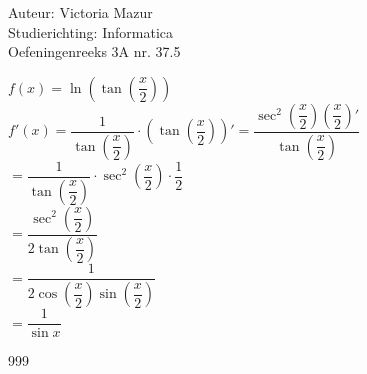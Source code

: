 \documentclass[a4paper]{article}
\begin{document}
  
\noindent \large Auteur: Victoria Mazur \\
\noindent \large Studierichting: Informatica\\
\noindent \large Oefeningenreeks 3A nr. 37.5\\

\medskip

\normalsize

$f(x) = \ln \left( \tan \left( \dfrac{x}{2} \right) \right)$ \\

$f'(x) = \dfrac{1}{\tan \left( \dfrac{x}{2} \right)} \cdot \left( \tan \left( \dfrac{x}{2} \right) \right)' = \dfrac{\sec^2 \left( \dfrac{x}{2} \right) \left( \dfrac{x}{2} \right)'}{\tan \left( \dfrac{x}{2} \right)}$ \\

$= \dfrac{1}{\tan \left( \dfrac{x}{2} \right)} \cdot \sec^2 \left( \dfrac{x}{2} \right) \cdot \dfrac{1}{2}$ \\

$= \dfrac{\sec^2 \left( \dfrac{x}{2} \right)}{2 \tan \left( \dfrac{x}{2} \right)}$ \\

$= \dfrac{1}{2 \cos \left( \dfrac{x}{2} \right)\sin \left( \dfrac{x}{2} \right)}$ \\

$= \dfrac{1}{\sin x}$ \\

\begin{thebibliography}{999}
\end{thebibliography}
\end{document}
